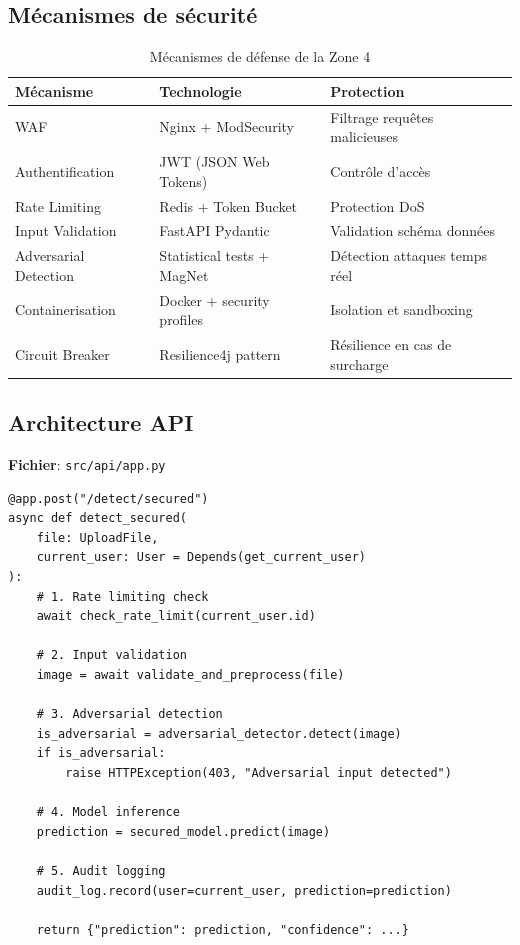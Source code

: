 \documentclass[11pt,a4paper]{article}
\begin{document}
\subsection{Mécanismes de sécurité}

\begin{table}[h!]
\centering
\caption{Mécanismes de défense de la Zone 4}
\label{tab:zone4_defenses}
\begin{tabularx}{\textwidth}{|l|X|X|}
\hline
\textbf{Mécanisme} & \textbf{Technologie} & \textbf{Protection} \\ \hline
WAF & Nginx + ModSecurity & Filtrage requêtes malicieuses \\ \hline
Authentification & JWT (JSON Web Tokens) & Contrôle d'accès \\ \hline
Rate Limiting & Redis + Token Bucket & Protection DoS \\ \hline
Input Validation & FastAPI Pydantic & Validation schéma données \\ \hline
Adversarial Detection & Statistical tests + MagNet & Détection attaques temps réel \\ \hline
Containerisation & Docker + security profiles & Isolation et sandboxing \\ \hline
Circuit Breaker & Resilience4j pattern & Résilience en cas de surcharge \\ \hline
\end{tabularx}
\end{table}

\subsection{Architecture API}

\textbf{Fichier}: \texttt{src/api/app.py}

\begin{tcolorbox}[colback=gray!5, colframe=gray!50, title=Extrait de code - FastAPI Secured Endpoint]
\begin{verbatim}
@app.post("/detect/secured")
async def detect_secured(
    file: UploadFile,
    current_user: User = Depends(get_current_user)
):
    # 1. Rate limiting check
    await check_rate_limit(current_user.id)

    # 2. Input validation
    image = await validate_and_preprocess(file)

    # 3. Adversarial detection
    is_adversarial = adversarial_detector.detect(image)
    if is_adversarial:
        raise HTTPException(403, "Adversarial input detected")

    # 4. Model inference
    prediction = secured_model.predict(image)

    # 5. Audit logging
    audit_log.record(user=current_user, prediction=prediction)

    return {"prediction": prediction, "confidence": ...}
\end{verbatim}
\end{tcolorbox}
\end{document}
